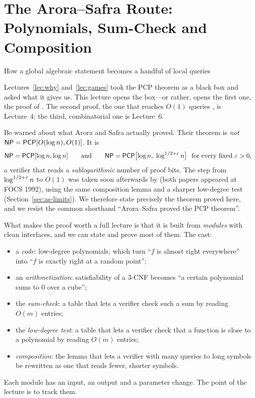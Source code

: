 \chapter{The Arora--Safra Route: Polynomials, Sum-Check and Composition}
\label{lec:as}

{\sffamily\large\color{softgray}How a global algebraic statement becomes a handful of local queries\par}
\vspace{0.5em}

\noindent
Lectures~\ref{lec:why} and~\ref{lec:games} took the PCP theorem as a black box and asked what it gives us.
This lecture opens the box---or rather, opens the first one, the proof of \citet{AroraSafra98}.  The second
proof, the one that reaches $O(1)$ queries \citep{ALMSS98}, is Lecture~4; the third, combinatorial one is
Lecture~6.

Be warned about what Arora and Safra actually proved.  Their theorem is \emph{not} $\mathsf{NP}=\mathsf{PCP}[O(\log n),O(1)]$.  It is
\[
  \mathsf{NP}=\mathsf{PCP}[\log n,\log n]\qquad\text{and}\qquad
  \mathsf{NP}=\mathsf{PCP}\bigl[\log n,\ \log^{1/2+\varepsilon}n\bigr]\ \text{ for every fixed }\varepsilon>0,
\]
a verifier that reads a \emph{sublogarithmic} number of proof bits.  The step from $\log^{1/2+\varepsilon}n$ to $O(1)$ was taken
soon afterwards by \citet{ALMSS98} (both papers appeared at FOCS 1992), using the same composition lemma and a sharper low-degree test (Section~\ref{sec:as-limits}).
We therefore state precisely the theorem proved here, and we resist the common shorthand ``Arora--Safra proved the PCP theorem''.

What makes the proof worth a full lecture is that it is built from \emph{modules} with clean interfaces, and we can
state and prove most of them.  The cast:
\begin{itemize}
  \item a \emph{code}: low-degree polynomials, which turn ``$f$ is almost right everywhere'' into ``$f$ is exactly right at a random point'';
  \item an \emph{arithmetization}: satisfiability of a $3$-CNF becomes ``a certain polynomial sums to $0$ over a cube'';
  \item the \emph{sum-check}: a table that lets a verifier check such a sum by reading $O(m)$ entries;
  \item the \emph{low-degree test}: a table that lets a verifier check that a function is close to a polynomial by reading $O(m)$ entries;
  \item \emph{composition}: the lemma that lets a verifier with many queries to long symbols be rewritten as one that reads
        fewer, shorter symbols.
\end{itemize}
Each module has an input, an output and a parameter change.  The point of the lecture is to track them.

